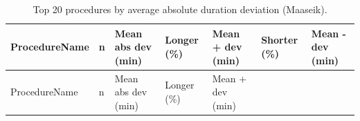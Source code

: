 \documentclass[
]{article}
\begin{document}
\begin{longtable}[]{@{}
  >{\centering\arraybackslash}p{}
  >{\centering\arraybackslash}p{}
  >{\centering\arraybackslash}p{}
  >{\centering\arraybackslash}p{}
  >{\centering\arraybackslash}p{}
  >{\centering\arraybackslash}p{}
  >{\centering\arraybackslash}p{}@{}}
\caption{Top 20 procedures by average absolute duration deviation
(Maaseik). \label{tab:duration_dev_proc}}\tabularnewline
\toprule\noalign{}
\begin{minipage}[b]{\linewidth}\centering
ProcedureName
\end{minipage} & \begin{minipage}[b]{\linewidth}\centering
n
\end{minipage} & \begin{minipage}[b]{\linewidth}\centering
Mean abs dev (min)
\end{minipage} & \begin{minipage}[b]{\linewidth}\centering
Longer (\%)
\end{minipage} & \begin{minipage}[b]{\linewidth}\centering
Mean + dev (min)
\end{minipage} & \begin{minipage}[b]{\linewidth}\centering
Shorter (\%)
\end{minipage} & \begin{minipage}[b]{\linewidth}\centering
Mean - dev (min)
\end{minipage} \\
\midrule\noalign{}
\endfirsthead
\toprule\noalign{}
\begin{minipage}[b]{\linewidth}\centering
ProcedureName
\end{minipage} & \begin{minipage}[b]{\linewidth}\centering
n
\end{minipage} & \begin{minipage}[b]{\linewidth}\centering
Mean abs dev (min)
\end{minipage} & \begin{minipage}[b]{\linewidth}\centering
Longer (\%)
\end{minipage} & \begin{minipage}[b]{\linewidth}\centering
Mean + dev (min)

\end{minipage}
\end{longtable}
\end{document}
